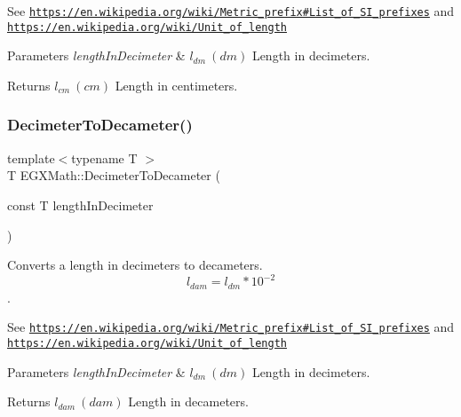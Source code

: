 See \href{https://en.wikipedia.org/wiki/Metric_prefix#List_of_SI_prefixes}{\tt https\+://en.\+wikipedia.\+org/wiki/\+Metric\+\_\+prefix\#\+List\+\_\+of\+\_\+\+S\+I\+\_\+prefixes} and \href{https://en.wikipedia.org/wiki/Unit_of_length}{\tt https\+://en.\+wikipedia.\+org/wiki/\+Unit\+\_\+of\+\_\+length} 
\begin{DoxyParams}{Parameters}
{\em length\+In\+Decimeter} & $ l_{dm}\ (dm)$ Length in decimeters. \\
\hline
\end{DoxyParams}
\begin{DoxyReturn}{Returns}
$ l_{cm}\ (cm)$ Length in centimeters. 
\end{DoxyReturn}
\mbox{\label{group___e_g_x_math-_conversions-_length_conversions-_decimeter-_s_i_ga20742de42223dbcd8af88e4e9feccfa4}} 
\subsubsection{\texorpdfstring{Decimeter\+To\+Decameter()}{DecimeterToDecameter()}}
{\footnotesize\ttfamily template$<$typename T $>$ \\
T E\+G\+X\+Math\+::\+Decimeter\+To\+Decameter (\begin{DoxyParamCaption}\item[{const T}]{length\+In\+Decimeter }\end{DoxyParamCaption})}



Converts a length in decimeters to decameters. \[ l_{dam}=l_{dm} * 10^{-2} \]. 

See \href{https://en.wikipedia.org/wiki/Metric_prefix#List_of_SI_prefixes}{\tt https\+://en.\+wikipedia.\+org/wiki/\+Metric\+\_\+prefix\#\+List\+\_\+of\+\_\+\+S\+I\+\_\+prefixes} and \href{https://en.wikipedia.org/wiki/Unit_of_length}{\tt https\+://en.\+wikipedia.\+org/wiki/\+Unit\+\_\+of\+\_\+length} 
\begin{DoxyParams}{Parameters}
{\em length\+In\+Decimeter} & $ l_{dm}\ (dm)$ Length in decimeters. \\
\hline
\end{DoxyParams}
\begin{DoxyReturn}{Returns}
$ l_{dam}\ (dam)$ Length in decameters. 
\end{DoxyReturn}
\mbox{\label{group___e_g_x_math-_conversions-_length_conversions-_decimeter-_s_i_ga9ee5daca58b2e6431c94ca9b8d5180b6}} 
